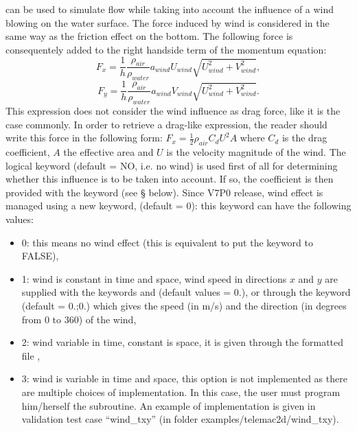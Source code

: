 can be used to simulate flow while taking into account the
influence of a wind blowing on the water surface.
The force induced by wind is considered in the same way as the friction effect
on the bottom.
The following force is consequentely added to the right handside term of the
momentum equation:
\begin{equation}
F_x = \frac{1}{h} \frac{\rho_{air}}{\rho_{water}}a_{wind}U_{wind}\sqrt{U^2_{wind}+V^2_{wind}},
\end{equation}
\begin{equation}
F_y = \frac{1}{h} \frac{\rho_{air}}{\rho_{water}}a_{wind}V_{wind}\sqrt{U^2_{wind}+V^2_{wind}}.
\end{equation}
This expression does not consider the wind influence as drag force,
like it is the case commonly.
In order to retrieve a drag-like expression, the reader should write this force
in the following form:
$F_x = \frac{1}{2}\rho_{air}C_d U^2 A$ where $C_d$ is the drag coefficient,
$A$ the effective area and $U$ is the velocity magnitude of the wind.
The logical keyword  (default = NO, i.e. no wind) is used first of
all for determining whether this influence is to be taken into account.
If so, the coefficient is then provided with the keyword
 (see {\S} below).
Since V7P0 release, wind effect is managed using a new keyword,
 (default = 0): this keyword can have the following
values:

\begin{itemize}
\item 0: this means no wind effect (this is equivalent to put the
 keyword  to FALSE),

\item 1: wind is constant in time and space, wind speed in directions
$x$ and $y$ are supplied with the keywords  and
 (default values = 0.),
or through the keyword  (default = 0.;0.)
which gives the speed (in m/s) and the direction (in degrees from 0 to 360) of
the wind,

\item 2: wind variable in time, constant is space,
it is given through the formatted file ,

\item 3: wind is variable in time and space, this option is not
implemented as there are multiple choices of implementation.
In this case, the user must program him/herself the  subroutine.
An example of implementation is given in validation test case ``wind\_txy''
(in folder examples/telemac2d/wind\_txy).
\end{itemize}

